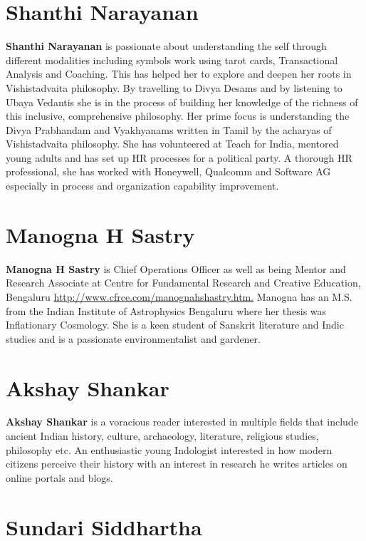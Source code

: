 \section*{Shanthi Narayanan}

\textbf{Shanthi Narayanan} is passionate about understanding the self through different modalities including symbols work using tarot cards, Transactional Analysis and Coaching. This has helped her to explore and deepen her roots in Vishistadvaita philosophy. By travelling to Divya Desams and by listening to Ubaya Vedantis she is in the process of building her knowledge of the richness of this inclusive, comprehensive philosophy. Her prime focus is understanding the Divya Prabhandam and Vyakhyanams written in Tamil by the acharyas of Vishistadvaita philosophy. She has volunteered at Teach for India, mentored young adults and has set up HR processes for a political party. A thorough HR professional, she has worked with Honeywell, Qualcomm and Software AG especially in process and organization capability improvement.

\section*{Manogna H Sastry}

\textbf{Manogna H Sastry} is Chief Operations Officer as well as being Mentor and Research Associate at Centre for Fundamental Research and Creative Education, Bengaluru \url{http://www.cfrce.com/manognahshastry.htm.} Manogna has an M.S. from the Indian Institute of Astrophysics Bengaluru where her thesis was Inflationary Cosmology. She is a keen student of Sanskrit literature and Indic studies and is a passionate environmentalist and gardener.

\section*{Akshay Shankar}

\vskip -2pt

\textbf{Akshay Shankar} is a voracious reader interested in multiple fields that include ancient Indian history, culture, archaeology, literature, religious studies, philosophy etc. An enthusiastic young Indologist interested in how modern citizens perceive their history with an interest in research he writes articles on online portals and blogs.

\section*{Sundari Siddhartha}

